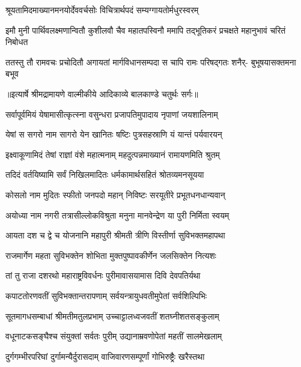\twolineshloka
{श्रूयतामिदमाख्यानमनयोर्देववर्चसोः}
{विचित्रार्थपदं सम्यग्गायतोर्मधुरस्वरम्} %

\fourlineindentedshloka
{इमौ मुनी पार्थिवलक्ष्मणान्वितौ}
{कुशीलवौ चैव महातपस्विनौ}
{ममापि तद्भूतिकरं प्रचक्षते}
{महानुभावं चरितं निबोधत} %

\fourlineindentedshloka
{ततस्तु तौ रामवचः प्रचोदितौ}
{अगायतां मार्गविधानसम्पदा}
{स चापि रामः परिषद्गतः शनैर्-}
{बुभूषयासक्तमना बभूव} %


{॥इत्यार्षे श्रीमद्रामायणे वाल्मीकीये आदिकाव्ये बालकाण्डे चतुर्थः सर्गः॥}


\twolineshloka
{सर्वापूर्वमियं येषामासीत्कृत्स्ना वसुन्धरा}
{प्रजापतिमुपादाय नृपाणां जयशालिनाम्} %

\twolineshloka
{येषां स सगरो नाम सागरो येन खानितः}
{षष्टिः पुत्रसहस्राणि यं यान्तं पर्यवारयन्} %

\twolineshloka
{इक्ष्वाकूणामिदं तेषां राज्ञां वंशे महात्मनाम्}
{महदुत्पन्नमाख्यानं रामायणमिति श्रुतम्} %

\twolineshloka
{तदिदं वर्तयिष्यामि सर्वं निखिलमादितः}
{धर्मकामार्थसहितं श्रोतव्यमनसूयया} %

\twolineshloka
{कोसलो नाम मुदितः स्फीतो जनपदो महान्}
{निविष्टः सरयूतीरे प्रभूतधनधान्यवान्} %

\twolineshloka
{अयोध्या नाम नगरी तत्रासील्लोकविश्रुता}
{मनुना मानवेन्द्रेण या पुरी निर्मिता स्वयम्} %

\twolineshloka
{आयता दश च द्वे च योजनानि महापुरी}
{श्रीमती त्रीणि विस्तीर्णा सुविभक्तमहापथा} %

\twolineshloka
{राजमार्गेण महता सुविभक्तेन शोभिता}
{मुक्तपुष्पावकीर्णेन जलसिक्तेन नित्यशः} %

\twolineshloka
{तां तु राजा दशरथो महाराष्ट्रविवर्धनः}
{पुरीमावासयामास दिवि देवपतिर्यथा} %

\twolineshloka
{कपाटतोरणवतीं सुविभक्तान्तरापणाम्}
{सर्वयन्त्रायुधवतीमुपेतां सर्वशिल्पिभिः} %

\twolineshloka
{सूतमागधसम्बाधां श्रीमतीमतुलप्रभाम्}
{उच्चाट्टालध्वजवतीं शतघ्नीशतसङ्कुलाम्} %

\twolineshloka
{वधूनाटकसङ्घैश्च संयुक्तां सर्वतः पुरीम्}
{उद्यानाम्रवणोपेतां महतीं सालमेखलाम्} %

\twolineshloka
{दुर्गगम्भीरपरिघां दुर्गामन्यैर्दुरासदाम्}
{वाजिवारणसम्पूर्णां गोभिरुष्ट्रैः खरैस्तथा} %

